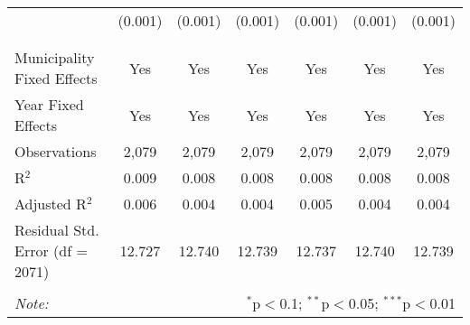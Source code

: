 \begin{table}[!htbp]
\begin{tabular}{@{\extracolsep{5pt}}lcccccc}
  & (0.001) & (0.001) & (0.001) & (0.001) & (0.001) & (0.001) \\ 
  & & & & & & \\ 
\hline \\[-1.8ex] 
Municipality Fixed Effects & Yes & Yes & Yes & Yes & Yes & Yes \\ 
Year Fixed Effects & Yes & Yes & Yes & Yes & Yes & Yes \\ 
Observations & 2,079 & 2,079 & 2,079 & 2,079 & 2,079 & 2,079 \\ 
R$^{2}$ & 0.009 & 0.008 & 0.008 & 0.008 & 0.008 & 0.008 \\ 
Adjusted R$^{2}$ & 0.006 & 0.004 & 0.004 & 0.005 & 0.004 & 0.004 \\ 
Residual Std. Error (df = 2071) & 12.727 & 12.740 & 12.739 & 12.737 & 12.740 & 12.739 \\ 
\hline 
\hline \\[-1.8ex] 
\textit{Note:}  & \multicolumn{6}{r}{$^{*}$p$<$0.1; $^{**}$p$<$0.05; $^{***}$p$<$0.01} \\ 
\end{tabular} 
\end{table} 
